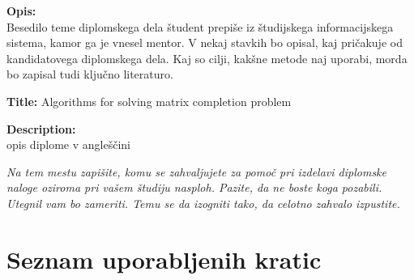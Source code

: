 \documentclass[a4paper,12pt,openright]{book}
\newcommand{\clearemptydoublepage}{\newpage{\pagestyle{empty}\cleardoublepage}}
\begin{document}
\bigskip
\noindent\textbf{Opis:}\\
Besedilo teme diplomskega dela študent prepiše iz študijskega informacijskega sistema, kamor ga je vnesel mentor.
V nekaj stavkih bo opisal, kaj pričakuje od kandidatovega diplomskega dela.
Kaj so cilji, kakšne metode naj uporabi, morda bo zapisal tudi ključno literaturo.

\bigskip
\noindent\textbf{Title:} Algorithms for solving matrix completion problem

\bigskip
\noindent\textbf{Description:}\\
opis diplome v angleščini

\vfill



\vspace{2cm}

\clearemptydoublepage

\thispagestyle{empty}\mbox{}\vfill\null\it%
\noindent
Na tem mestu zapišite, komu se zahvaljujete za pomoč pri izdelavi diplomske naloge oziroma pri vašem študiju nasploh. Pazite, da ne boste koga pozabili. Utegnil vam bo zameriti. Temu se da izogniti tako, da celotno zahvalo izpustite.
\rm\normalfont

\clearemptydoublepage


\clearemptydoublepage


\pagestyle{empty}
\def\thepage{}%
\tableofcontents{}


\clearemptydoublepage


\chapter*{Seznam uporabljenih kratic}
\end{document}
